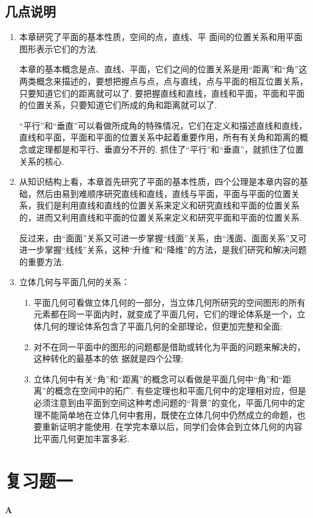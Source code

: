 \subsection{几点说明}
\begin{enumerate}
\item 本章研究了平面的基本性质，空间的点，直线、平
面间的位置关系和用平面图形表示它们的方法.

本章的基本概念是点、直线、平面，它们之间的位置关系是用“距离”和“角”这两类概念来描述的，要想把握点与点，点与直线，点与平面的相互位置关系，只要知道它们的距离就可以了. 要把握直线和直线，直线和平面，平面和平面的位置关系，只要知道它们所成的角和距离就可以了.

“平行”和“垂直”可以看做所成角的特殊情况，它们在定义和描述直线和直线，直线和平面，平面和平面的位置关系中起着重要作用，所有有关角和距离的概念或定理都是和平行、垂直分不开的. 抓住了“平行”和“垂直”，就抓住了位置关系的核心.
\item 从知识结构上看，本章首先研究了平面的基本性质，四个公理是本章内容的基础，然后由易到难顺序研究直线和直线，直线与平面，平面与平面的位置关系，我们是利用直线和直线的位置关系来定义和研究直线和平面的位置关系的，进而又利用直线和平面的位置关系来定义和研究平面和平面的位置关系.

反过来，由“面面”关系又可进一步掌握“线面”关系，由“浅面、面面关系”又可进一步掌握“线线”关系，这种“升维”和“降维”的方法，是我们研究和解决问题的重要方法.

\item 立体几何与平面几何的关系：
\begin{enumerate}[(1)]
\item 平面几何可看做立体几何的一部分，当立体几何所研究的空间图形的所有元素都在同一平面内时，就变成了平面几何，它们的理论体系是一个，立体几何的理论体系包含了平面几何的全部理论，但更加完整和全面;
\item 对不在同一平面中的图形的问题都是借助或转化为平面的问题来解决的，这种转化的最基本的依
据就是四个公理;
\item 立体几何中有关“角”和“距离”的概念可以看做是平面几何中“角”和“距离”的概念在空间中的拓广. 有些定理也和平面几何中的定理相对应，但是必须注意到由平面到空间这种考虑问题的“背景”的变化，平面几何中的定理不能简单地在立体几何中套用，既使在立体几何中仍然成立的命题，也要重新证明才能使用. 在学完本章以后，同学们会体会到立体几何的内容比平面几何更加丰富多彩.
\end{enumerate}

\end{enumerate}


\section*{复习题一}
\begin{center}
    \bfseries A
\end{center}

